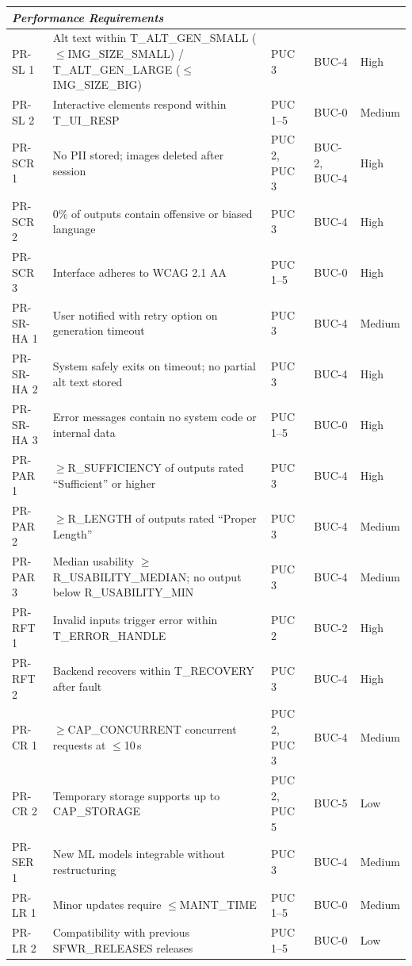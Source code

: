 \documentclass[12pt]{article}
\begin{document}
\begin{longtable}{p{2.2cm}p{5.5cm}p{2.2cm}p{2.0cm}p{1.5cm}}
\multicolumn{5}{l}{\textit{Performance Requirements}} \\
\midrule
PR-SL 1    & Alt text within T\_ALT\_GEN\_SMALL ($\leq$IMG\_SIZE\_SMALL) / T\_ALT\_GEN\_LARGE ($\leq$IMG\_SIZE\_BIG) & PUC 3 & BUC-4 & High \\
PR-SL 2    & Interactive elements respond within T\_UI\_RESP               & PUC 1--5           & BUC-0         & Medium \\
PR-SCR 1   & No PII stored; images deleted after session                 & PUC 2, PUC 3       & BUC-2, BUC-4  & High   \\
PR-SCR 2   & 0\% of outputs contain offensive or biased language         & PUC 3              & BUC-4         & High   \\
PR-SCR 3   & Interface adheres to WCAG 2.1 AA                            & PUC 1--5           & BUC-0         & High   \\
PR-SR-HA 1 & User notified with retry option on generation timeout       & PUC 3              & BUC-4         & Medium \\
PR-SR-HA 2 & System safely exits on timeout; no partial alt text stored  & PUC 3              & BUC-4         & High   \\
PR-SR-HA 3 & Error messages contain no system code or internal data      & PUC 1--5           & BUC-0         & High   \\
PR-PAR 1   & $\geq$R\_SUFFICIENCY of outputs rated ``Sufficient'' or higher & PUC 3             & BUC-4         & High   \\
PR-PAR 2   & $\geq$R\_LENGTH of outputs rated ``Proper Length''           & PUC 3              & BUC-4         & Medium \\
PR-PAR 3   & Median usability $\geq$R\_USABILITY\_MEDIAN; no output below R\_USABILITY\_MIN & PUC 3 & BUC-4 & Medium \\
PR-RFT 1   & Invalid inputs trigger error within T\_ERROR\_HANDLE         & PUC 2              & BUC-2         & High   \\
PR-RFT 2   & Backend recovers within T\_RECOVERY after fault              & PUC 3              & BUC-4         & High   \\
PR-CR 1    & $\geq$CAP\_CONCURRENT concurrent requests at $\leq$10\,s    & PUC 2, PUC 3       & BUC-4         & Medium \\
PR-CR 2    & Temporary storage supports up to CAP\_STORAGE               & PUC 2, PUC 5       & BUC-5         & Low    \\
PR-SER 1   & New ML models integrable without restructuring               & PUC 3              & BUC-4         & Medium \\
PR-LR 1    & Minor updates require $\leq$MAINT\_TIME                     & PUC 1--5           & BUC-0         & Medium \\
PR-LR 2    & Compatibility with previous SFWR\_RELEASES releases          & PUC 1--5           & BUC-0         & Low    \\
\midrule


\end{longtable}
\end{document}
